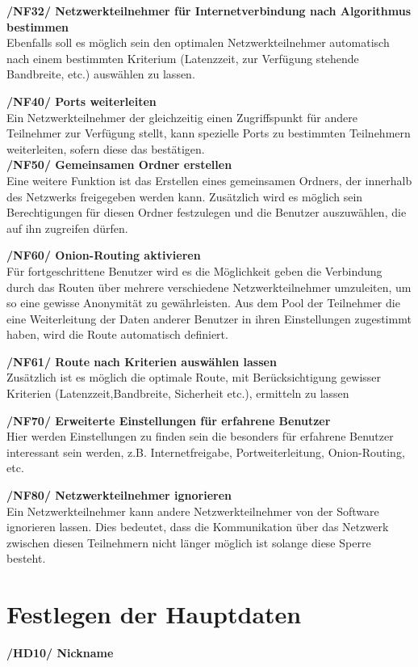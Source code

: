 \documentclass[a4paper,12pt]{scrreprt}
\begin{document}
	\textbf {/NF32/ Netzwerkteilnehmer für Internetverbindung nach Algorithmus bestimmen}
	\\Ebenfalls soll es möglich sein den optimalen Netzwerkteilnehmer automatisch nach einem bestimmten Kriterium (Latenzzeit, zur Verfügung stehende Bandbreite, etc.) auswählen zu lassen.
	
	\textbf {/NF40/ Ports weiterleiten}
	\\Ein Netzwerkteilnehmer der gleichzeitig einen Zugriffspunkt für andere Teilnehmer zur Verfügung stellt, kann spezielle Ports zu bestimmten Teilnehmern weiterleiten, sofern diese das bestätigen.\\
	
	\textbf {/NF50/ Gemeinsamen Ordner erstellen}
	\\Eine weitere Funktion ist das Erstellen eines gemeinsamen Ordners, der innerhalb des Netzwerks freigegeben werden kann. Zusätzlich wird es möglich sein Berechtigungen für diesen Ordner festzulegen und die Benutzer auszuwählen, die auf ihn zugreifen dürfen.
	
	\textbf {/NF60/ Onion-Routing aktivieren}
	\\Für fortgeschrittene Benutzer wird es die Möglichkeit geben die Verbindung durch das Routen über mehrere verschiedene Netzwerkteilnehmer umzuleiten, um so eine gewisse Anonymität zu gewährleisten. Aus dem Pool der Teilnehmer die eine Weiterleitung der Daten anderer Benutzer in ihren Einstellungen zugestimmt haben, wird die Route automatisch definiert.
	
	\textbf {/NF61/ Route nach Kriterien auswählen lassen}
	\\Zusätzlich ist es möglich die optimale Route, mit Berücksichtigung gewisser Kriterien (Latenzzeit,Bandbreite, Sicherheit etc.), ermitteln zu lassen
	
	\textbf {/NF70/ Erweiterte Einstellungen für erfahrene Benutzer}
	\\Hier werden Einstellungen zu finden sein die besonders für erfahrene Benutzer interessant sein werden, z.B. Internetfreigabe, Portweiterleitung, Onion-Routing, etc.
	
	\textbf {/NF80/ Netzwerkteilnehmer ignorieren}	
	\\Ein Netzwerkteilnehmer kann andere Netzwerkteilnehmer von der Software ignorieren lassen. Dies bedeutet, dass die Kommunikation über das Netzwerk zwischen diesen Teilnehmern nicht länger möglich ist solange diese Sperre besteht.
	
	\section{Festlegen der Hauptdaten}
	\textbf {/HD10/ Nickname}
	
\end{document}
